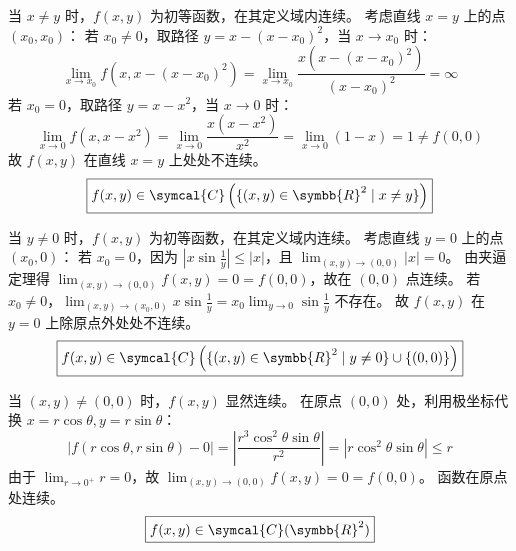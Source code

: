 \begin{solution}

    当 $x \neq y$ 时，$f(x, y)$ 为初等函数，在其定义域内连续。
    考虑直线 $x = y$ 上的点 $(x_0, x_0)$：
    若 $x_0 \neq 0$，取路径 $y = x - (x-x_0)^2$，当 $x \to x_0$ 时：
    \begin{equation}
        \lim_{x \to x_0} f(x, x - (x-x_0)^2) = \lim_{x \to x_0} \frac{x(x - (x-x_0)^2)}{(x-x_0)^2} = \infty
    \end{equation}
    若 $x_0 = 0$，取路径 $y = x - x^2$，当 $x \to 0$ 时：
    \begin{equation}
        \lim_{x \to 0} f(x, x - x^2) = \lim_{x \to 0} \frac{x(x - x^2)}{x^2} = \lim_{x \to 0} (1 - x) = 1 \neq f(0, 0)
    \end{equation}
    故 $f(x, y)$ 在直线 $x = y$ 上处处不连续。
    \begin{equation}
        \boxed{f(x, y) \in \symcal{C}\left( \{(x, y) \in \symbb{R}^2 \mid x \neq y\} \right)}
    \end{equation}


    当 $y \neq 0$ 时，$f(x, y)$ 为初等函数，在其定义域内连续。
    考虑直线 $y = 0$ 上的点 $(x_0, 0)$：
    若 $x_0 = 0$，因为 $\left| x \sin \frac{1}{y} \right| \le |x|$，且 $\lim_{(x, y) \to (0, 0)} |x| = 0$。
    由夹逼定理得 $\lim_{(x, y) \to (0, 0)} f(x, y) = 0 = f(0, 0)$，故在 $(0, 0)$ 点连续。
    若 $x_0 \neq 0$，$\lim_{(x, y) \to (x_0, 0)} x \sin \frac{1}{y} = x_0 \lim_{y \to 0} \sin \frac{1}{y}$ 不存在。
    故 $f(x, y)$ 在 $y = 0$ 上除原点外处处不连续。
    \begin{equation}
        \boxed{f(x, y) \in \symcal{C}\left( \{(x, y) \in \symbb{R}^2 \mid y \neq 0\} \cup \{(0, 0)\} \right)}
    \end{equation}


    当 $(x, y) \neq (0, 0)$ 时，$f(x, y)$ 显然连续。
    在原点 $(0, 0)$ 处，利用极坐标代换 $x = r \cos \theta, y = r \sin \theta$：
    \begin{equation}
        |f(r \cos \theta, r \sin \theta) - 0| = \left| \frac{r^3 \cos^2 \theta \sin \theta}{r^2} \right| = |r \cos^2 \theta \sin \theta| \le r
    \end{equation}
    由于 $\lim_{r \to 0^+} r = 0$，故 $\lim_{(x, y) \to (0, 0)} f(x, y) = 0 = f(0, 0)$。
    函数在原点处连续。
    \begin{equation}
        \boxed{f(x, y) \in \symcal{C}(\symbb{R}^2)}
    \end{equation}


\end{solution}
